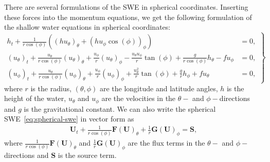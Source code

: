 There are several formulations of the SWE in spherical coordinates.
Inserting these forces into the momentum equations, we get the following formulation of the shallow water equations in spherical coordinates:
\begin{equation}\label{eq:spherical-swe}
    \left.
    \begin{aligned}
        h_t + \frac{1}{r \cos (\phi)} \left( {(h u_\theta)}_{\theta} + {(h u_{\phi} \cos(\phi))}_{\phi}  \right) &= 0, \\
        {(u_{\theta})}_t  + \frac{u_\theta}{r \cos (\phi)} {(u_\theta)}_\theta + \frac{u_\phi}{r} {(u_\theta)}_{\phi}
        - \frac{u_\theta u_\phi }{r} \tan(\phi) + \frac{g}{r \cos (\phi)} h_\theta - f u_\phi &= 0, \\
        {(u_{\phi})}_t  + \frac{u_\theta}{r \cos (\phi)} {(u_\phi)}_\theta + \frac{u_\phi}{r} {(u_\phi)}_{\phi}
        + \frac{u_\theta^2}{r} \tan(\phi) + \frac{g}{r} h_\phi + f u_\theta &= 0,
    \end{aligned}
    \right\}
\end{equation}
where $r$ is the radius, $(\theta, \phi)$ are the longitude and latitude angles, $h$ is the height of the water, $u_\theta$ and $u_\phi$ are the velocities in the $\theta-$ and $\phi-$directions and $g$ is the gravitational constant.
We can also write the spherical SWE~\eqref{eq:spherical-swe} in vector form as
\begin{align}
    \mathbf{U}_t + \frac{1}{r \cos(\phi)} \mathbf{F(U)}_\theta + \frac{1}{r} \mathbf{G(U)}_\phi = \mathbf{S},
\end{align}
where $\frac{1}{r \cos(\phi)} \mathbf{F(U)}_\theta$ and $\frac{1}{r} \mathbf{G(U)}_\phi$ are the flux terms in the $\theta-$ and $\phi-$directions and $\mathbf{S}$ is the source term.





